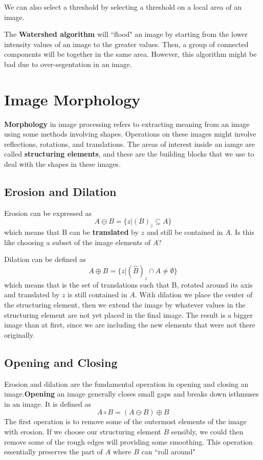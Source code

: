 \documentclass{tufte-handout}
\begin{document}
We can also select a threshold by selecting a threshold on a local area of an image.

The \textbf{Watershed algorithm} will ``flood" an image by starting from the lower 
intensity values of an image to the greater values. Then, a group of connected 
components will be together in the same area. However, this algorithm might be 
bad due to over-segentation in an image.

\section{Image Morphology}
\textbf{Morphology} in image processing refers to extracting meaning 
from an image using some methods involving shapes. Operations
on these images might involve reflections, rotations, and 
translations. The areas of interest inside an iamge are called
\textbf{structuring elements}, and these are the building blocks that
we use to deal with the shapes in these images.

\subsection{Erosion and Dilation}
Erosion can be expressed as
\[A \ominus B = \{z|(B)_{z} \subseteq A\}\]
which means that B can be \textbf{translated} by $z$ and still be
contained in $A$. Is this like choosing a subset of the image 
elements of $A$?

Dilation can be defined as 
\[A \oplus B = \{z|(\hat{B})_{z} \cap A \neq \emptyset\}\]
which means that is the set of translations such that B, rotated
around its axis and translated by $z$ is still contained in $A$.
With dilation we place the center of the structuring element, then we
extend the image by whatever values in the structuring element are
not yet placed in the final image. The result is a bigger image
than at first, since we are including the new elements that were not 
there originally.

\subsection{Opening and Closing}
Erosion and dilation are the fundamental operation in opening and closing 
an image.\textbf{Opening} an image generally closes small gaps and breaks
down isthmuses in an image. It is defined as 
\[A \circ B = (A\ominus B)\oplus B\]
The first operation is to remove some of the outermost elements of the image
with erosion. If we choose our structuring element $B$ sensibly, we could then
remove some of the rough edges will providing some smoothing. This operation
essentially preserves the part of $A$ where $B$ can ``roll around"
\end{document}
